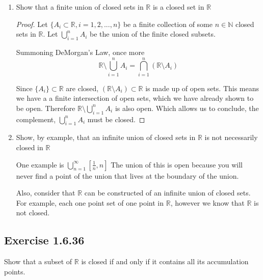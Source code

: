 \documentclass{tufte-book}
\theoremstyle{mytheoremstyle}
\theoremstyle{mylemstyle}
\theoremstyle{mydefstyle}
\begin{document}
\begin{enumerate}
\begin{proof}
By definition $\mathbb{R} \setminus \bigcap\limits_{i \in I} A_i = \bigcup\limits_{i \in I} (\mathbb{R} \setminus A_i)$.

Since $\{A_i\} \subset \mathbb{R}$ are closed, $(\mathbb{R} \setminus A_i) \subset \mathbb{R}$ is made up of open sets.  So we have an arbitrary union of open sets in $\mathbb{R}$ which we have already shown to be open.  This means  $\mathbb{R} \setminus \bigcap\limits_{i \in I} A_i$ is also open.  Therefore it's compliment $\bigcap\limits_{i \in I}A_i$ is closed.

\end{proof}

\item Show that a finite union of closed sets in $\mathbb{R}$ is a closed set in $\mathbb{R}$ 
\begin{proof}

Let $\{A_i \subset \mathbb{R}, i=1, 2,...,n\}$ be a finite collection of some $n \in \mathbb{N}$ closed sets in $\mathbb{R}$.  Let $\bigcup\limits_{i=1}^{n}A_i$ be the union of the finite closed subsets.

Summoning DeMorgan's Law, once more
\[\mathbb{R} \setminus \bigcup\limits_{i=1}^{n} A_i = \bigcap\limits_{i=1}^{n}(\mathbb{R} \setminus A_i)\]

Since $\{A_i\} \subset \mathbb{R}$ are closed, $(\mathbb{R} \setminus A_i) \subset \mathbb{R}$ is made up of open sets.  This means we have a a finite intersection of open sets, which we have already shown to be open.  Therefore $\mathbb{R} \setminus \bigcup\limits_{i=1}^{n} A_i $ is also open.  Which allows us to conclude, the complement,  $\bigcup\limits_{i=1}^{n} A_i $ must be closed.

\end{proof}

\item Show, by example, that an infinite union of closed sets in $\mathbb{R}$ is not necessarily closed in $\mathbb{R}$

One example is $\bigcup\limits_{n=1}^{\infty}[\frac{1}{n}, n]$  The union of this is open because you will never find a point of the union that lives at the boundary of the union.

Also, consider that $\mathbb{R}$ can be constructed of an infinite union of closed sets.   For example, each one point set of one point in $\mathbb{R}$, however we know that $\mathbb{R}$ is not closed.
\end{enumerate}

\subsection{Exercise 1.6.36}
Show that a subset of $\mathbb{R}$ is closed if and only if it contains all its accumulation points.
\end{document}
